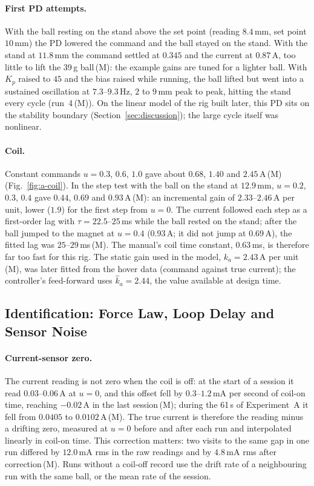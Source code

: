 \documentclass[11pt,a4paper]{article}
\newcommand{\st}[1]{\,\textup{(#1)}}
\begin{document}
\paragraph{First PD attempts.} With the ball resting on the stand above the set point (reading $8.4$\,mm, set point
$10$\,mm) the PD lowered the command and the ball stayed on the stand. With the stand at $11.8$\,mm the command settled at
$0.345$ and the current at $0.87$\,A, too little to lift the 39\,g ball\st{M}: the example gains are tuned for a lighter ball.
With $K_p$ raised to $45$ and the bias raised while running, the ball lifted but went into a sustained oscillation at
$7.3$--$9.3$\,Hz, $2$ to $9$\,mm peak to peak, hitting the stand every cycle (run~4\st{M}). On the linear model of the rig
built later, this PD sits on the stability boundary (Section~\ref{sec:discussion}); the large cycle itself was nonlinear.

\paragraph{Coil.} Constant commands $u = 0.3$, $0.6$, $1.0$ gave about $0.68$, $1.40$ and $2.45$\,A\st{M}
(Fig.~\ref{fig:a-coil}). In the step test with the ball on the stand at $12.9$\,mm, $u = 0.2$, $0.3$, $0.4$ gave
$0.44$, $0.69$ and $0.93$\,A\st{M}: an incremental gain of $2.33$--$2.46$\,A per unit, lower ($1.9$) for the first step from
$u=0$. The current followed each step as a first-order lag with $\tau = 22.5$--$25$\,ms while the ball rested on the
stand; after the ball jumped to the magnet at $u=0.4$ ($0.93$\,A; it did not jump at $0.69$\,A), the fitted lag was
$25$--$29$\,ms\st{M}. The manual's coil time constant, $0.63$\,ms, is therefore far too fast for this rig. The static gain
used in the model, $k_a = 2.43$\,A per unit\st{M}, was later fitted from the hover data (command against true current);
the controller's feed-forward uses $\hat k_a = 2.44$, the value available at design time.

\subsection{Identification: Force Law, Loop Delay and Sensor Noise}
\label{sec:obs-ident}
\paragraph{Current-sensor zero.} The current reading is not zero when the coil is off: at the start of a session it read
$0.03$--$0.06$\,A at $u=0$, and this offset fell by $0.3$--$1.2$\,mA per second of coil-on time, reaching $-0.02$\,A in the last session\st{M}; during the 61\,s of Experiment~A it fell from $0.0405$ to $0.0102$\,A\st{M}. The true
current is therefore the reading minus a drifting zero, measured at $u=0$ before and after each run and interpolated
linearly in coil-on time. This correction matters: two visits to the same gap in one run differed by $12.0$\,mA rms in the
raw readings and by $4.8$\,mA rms after correction\st{M}. Runs without a coil-off record use the drift rate of a
neighbouring run with the same ball, or the mean rate of the session.
\end{document}
